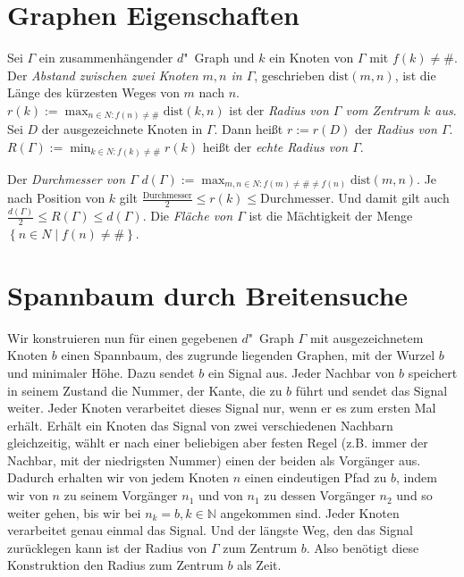 \documentclass[11pt]{article}
\newcommand{\defWord}[1]{\emph{#1}}
\begin{document}
\section{Graphen Eigenschaften}

\begin{definition}
	Sei $\Gamma$ ein zusammenhängender $d$"~Graph und $k$ ein Knoten von $\Gamma$ mit $f\left(k\right) \neq \#$.
	Der \defWord{Abstand zwischen zwei Knoten $m, n$ in $\Gamma$}, geschrieben $\text{dist}\left(m , n\right)$, ist die Länge des kürzesten Weges von $m$ nach $n$.
	$r\left(k\right) := \max_{n \in N : f\left(n\right) \neq \#} \text{dist}\left(k, n\right)$ ist der \defWord{Radius von $\Gamma$ vom Zentrum $k$ aus}.
	Sei $D$ der ausgezeichnete Knoten in $\Gamma$.
	Dann heißt $r := r\left(D\right)$ der \defWord{Radius von $\Gamma$}.
	$R\left(\Gamma\right) := \min_{k \in N : f\left(k\right) \neq \#} r\left(k\right)$ heißt der \defWord{echte Radius von $\Gamma$}.
	
	Der \defWord{Durchmesser von $\Gamma$} $d\left(\Gamma\right) := \max_{m, n \in N : f\left(m\right) \neq \# \neq f\left(n\right)} \text{dist}\left(m, n\right)$. Je nach Position von $k$ gilt $\frac{\text{Durchmesser}}{2} \le r\left(k\right) \le \text{Durchmesser}.$ Und damit gilt auch $\frac{d\left(\Gamma\right)}{2} \le R\left(\Gamma\right) \le d\left(\Gamma\right)$.
	Die \defWord{Fläche von $\Gamma$} ist die Mächtigkeit der Menge $ \left\{n \in N \mid f\left(n\right) \neq \# \right\}$.
	
\end{definition}

\section{Spannbaum durch Breitensuche}
Wir konstruieren nun für einen gegebenen $d$"~Graph $\Gamma$ mit ausgezeichnetem Knoten $b$ einen Spannbaum, des zugrunde liegenden Graphen, mit der Wurzel $b$ und minimaler Höhe. 
Dazu sendet $b$ ein Signal aus. Jeder Nachbar von $b$ speichert in seinem Zustand die Nummer, der Kante, die zu $b$ führt und sendet das Signal weiter. 
Jeder Knoten verarbeitet dieses Signal nur, wenn er es zum ersten Mal erhält. 
Erhält ein Knoten das Signal von zwei verschiedenen Nachbarn gleichzeitig, wählt er nach einer beliebigen aber festen Regel (z.B. immer der Nachbar, mit der niedrigsten Nummer) einen der beiden als Vorgänger aus. 
Dadurch erhalten wir von jedem Knoten $n$ einen eindeutigen Pfad zu $b$, indem wir von $n$ zu seinem Vorgänger $n_1$ und von $n_1$ zu dessen Vorgänger $n_2$ und so weiter gehen, bis wir bei $n_k=b, k \in \mathbb{N}$ angekommen sind. 
Jeder Knoten verarbeitet genau einmal das Signal. 
Und der längste Weg, den das Signal zurücklegen kann ist der Radius von $\Gamma$ zum Zentrum $b$. 
Also benötigt diese Konstruktion den Radius zum Zentrum $b$ als Zeit.
\end{document}
